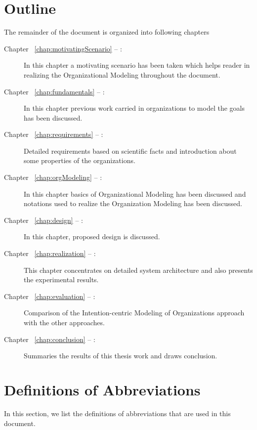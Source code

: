 \section {Outline}
\label{sec:outline}
The remainder of the document is organized into following chapters
\begin{description}
\item[Chapter ~\ref{chap:motivatingScenario} -- :] In this chapter a motivating scenario has been taken which helps reader in realizing the Organizational Modeling throughout the document. 
\item[Chapter ~\ref{chap:fundamentals} -- :] In this chapter previous work carried in organizations to model the goals has been discussed.
\item[Chapter ~\ref{chap:requirements} -- :] Detailed requirements based on scientific facts and introduction about some properties of the organizations.
\item[Chapter ~\ref{chap:orgModeling} -- :] In this chapter basics of Organizational Modeling has been discussed and notations used to realize the Organization Modeling has been discussed.
\item[Chapter ~\ref{chap:design} -- :] In this chapter, proposed design is discussed. 
 
\item[Chapter ~\ref{chap:realization} -- :] This chapter concentrates on detailed system architecture and also presents the experimental results.
\item[Chapter ~\ref{chap:evaluation} -- :] Comparison of the Intention-centric Modeling of Organizations approach with the other approaches.
\item[Chapter ~\ref{chap:conclusion} -- :] Summaries the results of this thesis work and draws conclusion. 
\end{description}

\section{Definitions of Abbreviations}
\label{sec:definitionsandabbrevations}
In this section, we list the definitions of abbreviations that are used in this document.


